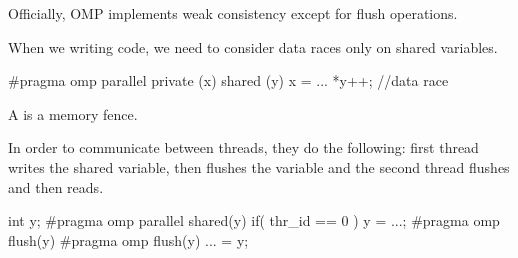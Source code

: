     Officially, OMP implements weak consistency except for flush operations.

    \begin{tcolorbox}[rouge]
    \begin{image}{When we writing code, we need to consider data races only on shared variables.}
        \begin{codeCenter}
        \begin{Ccode}
#pragma omp parallel
private (x) shared (y)
{
    x = ...
    *y++; //data race
}
        \end{Ccode}
        \end{codeCenter}
    \end{image}
    \end{tcolorbox}
    \begin{tcolorbox}[vert]
        A  is a memory fence.
    \end{tcolorbox}
    \begin{image}{In order to communicate between threads, they do the following: first thread writes the shared variable, then flushes the variable and the second thread flushes and then reads.}
        \begin{codeCenter}
        \begin{Ccode}
int y;
#pragma omp parallel shared(y)
{
    if( thr_id == 0 ) {
    y = ...;
    #pragma omp flush(y)
}
    #pragma omp flush(y)
    ... = y;
}
        \end{Ccode}
        \end{codeCenter}
    \end{image}
 
